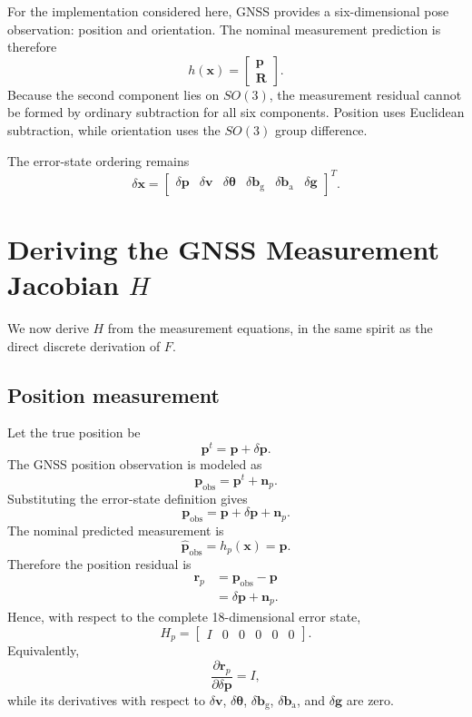 \documentclass[11pt]{article}
\newcommand{\R}{\mathbf{R}}
\newcommand{\p}{\mathbf{p}}
\newcommand{\vct}{\mathbf{v}}
\newcommand{\bg}{\mathbf{b}_{\mathrm{g}}}
\newcommand{\ba}{\mathbf{b}_{\mathrm{a}}}
\newcommand{\g}{\mathbf{g}}
\begin{document}
For the implementation considered here, GNSS provides a six-dimensional pose observation: position and orientation. The nominal measurement prediction is therefore
\begin{equation}
h(\bm x)=
\begin{bmatrix}
\p\\
\R
\end{bmatrix}.
\end{equation}
Because the second component lies on $SO(3)$, the measurement residual cannot be formed by ordinary subtraction for all six components. Position uses Euclidean subtraction, while orientation uses the $SO(3)$ group difference.

The error-state ordering remains
\begin{equation}
\delta\bm x=
\begin{bmatrix}
\delta\p &
\delta\vct &
\delta\bm\theta &
\delta\bg &
\delta\ba &
\delta\g
\end{bmatrix}^{T}.
\end{equation}

\section{Deriving the GNSS Measurement Jacobian $H$}
We now derive $H$ from the measurement equations, in the same spirit as the direct discrete derivation of $F$.

\subsection{Position measurement}
Let the true position be
\begin{equation}
\p^t=\p+\delta\p.
\end{equation}
The GNSS position observation is modeled as
\begin{equation}
\p_{\mathrm{obs}}=\p^t+\bm n_p.
\end{equation}
Substituting the error-state definition gives
\begin{equation}
\p_{\mathrm{obs}}
=
\p+\delta\p+\bm n_p.
\end{equation}
The nominal predicted measurement is
\begin{equation}
\hat{\p}_{\mathrm{obs}}=h_p(\bm x)=\p.
\end{equation}
Therefore the position residual is
\begin{align}
\bm r_p
&=\p_{\mathrm{obs}}-\p\\
&=\delta\p+\bm n_p.
\end{align}
Hence, with respect to the complete 18-dimensional error state,
\begin{equation}
\boxed{
H_p
=
\begin{bmatrix}
I & 0 & 0 & 0 & 0 & 0
\end{bmatrix}.
}
\end{equation}
Equivalently,
\begin{equation}
\frac{\partial\bm r_p}{\partial\delta\p}=I,
\end{equation}
while its derivatives with respect to $\delta\vct$, $\delta\bm\theta$, $\delta\bg$, $\delta\ba$, and $\delta\g$ are zero.
\end{document}
